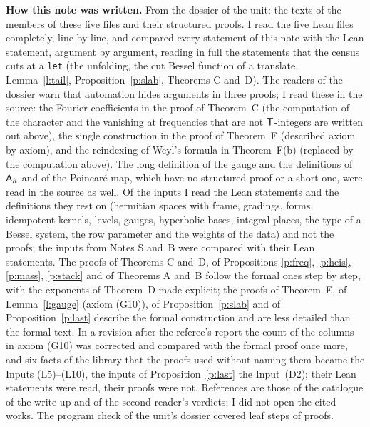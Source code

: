 \documentclass[11pt,a4paper]{article}
\newcommand{\subhead}[1]{\par\addvspace{9pt plus 2pt}\Needspace{4\baselineskip}\noindent\textbf{#1}\enspace\ignorespaces}
\theoremstyle{plainx}
\theoremstyle{uprightx}
\newcommand{\Inp}[1]{\textup{(#1)}}
\begin{document}
\subhead{How this note was written.} From the dossier of the unit: the texts of the members of these five files
and their structured proofs. I read the five Lean files completely, line by line, and compared every statement of
this note with the Lean statement, argument by argument, reading in full the statements that the census cuts at a
\texttt{let} (the unfolding, the cut Bessel function of a translate, Lemma~\ref{l:tail}, Proposition~\ref{p:slab},
Theorems C and~D). The readers of the dossier warn that automation hides arguments in three proofs; I read these in
the source: the Fourier coefficients in the proof of Theorem~C (the computation of the character and the vanishing
at frequencies that are not $\mathsf{T}$-integers are written out above), the single construction in the proof of
Theorem~E (described axiom by axiom), and the reindexing of Weyl's formula in Theorem~F(b) (replaced by the
computation above). The long definition of the gauge and the definitions of $\mathsf{A}_{h}$ and of the Poincar\'e map,
which have no structured proof or a short one, were read in the source as well. Of the inputs I read the Lean
statements and the definitions they rest on (hermitian spaces with frame, gradings, forms, idempotent kernels,
levels, gauges, hyperbolic bases, integral places, the type of a Bessel system, the row parameter and the weights of
the data) and not the proofs; the inputs from Notes S and~B were compared with their Lean statements. The proofs of
Theorems C and~D, of Propositions \ref{p:freq}, \ref{p:heis}, \ref{p:mass}, \ref{p:stack} and of Theorems A and~B
follow the formal ones step by step, with the exponents of Theorem~D made explicit; the proofs of Theorem~E, of
Lemma~\ref{l:gauge} (axiom (G10)), of Proposition~\ref{p:slab} and of Proposition~\ref{p:last} describe the formal
construction and are less detailed than the formal text. In a revision after the referee's report the count of the
columns in axiom (G10) was corrected and compared with the formal proof once more, and six facts of the library
that the proofs used without naming them became the Inputs \Inp{L5}--\Inp{L10}, the inputs of
Proposition~\ref{p:last} the Input~\Inp{D2}; their Lean statements were read, their proofs were not. References are
those of the catalogue of the write-up and of the second reader's verdicts; I did not open the cited works. The program check of the unit's dossier covered
\UnitSteps{} leaf steps of \UnitProofs{} proofs.
\end{document}
